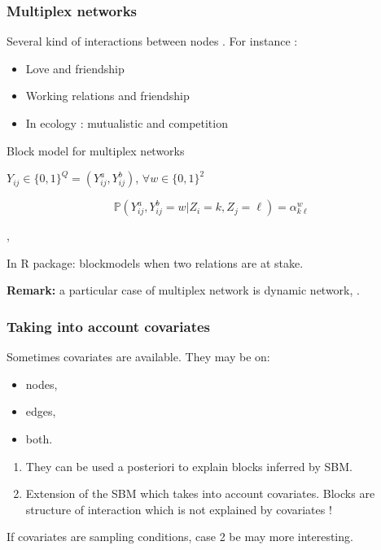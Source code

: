 \documentclass[compress,10pt]{beamer}
\begin{document}
\begin{frame} \frametitle{Multiplex networks}

Several kind of interactions between nodes . 
For instance : 


\begin{itemize}
\item Love and friendship
\item Working relations and friendship
\item  In ecology : mutualistic and competition
\end{itemize}


\begin{block}{Block model for multiplex networks}

$Y_{ij} \in \{0,1\} ^ Q = (Y_{ij}^a, Y_{ij}^b)$, $\forall w \in \{0,1\}^2$ 



$$\mathbb{P}(Y^a_{ij},Y^b_{ij} = w  | Z_i  = k, Z_j = \ell)  = \alpha^w _{k\ell}$$

\end{block}

\textcolor{mygreen}{
\cite{kefi}, \cite{barbillon2017stochastic}}

In \textcolor{mygreen}{R package: blockmodels} when two relations are at stake.
 

 \textbf{Remark:} a particular case of multiplex network is dynamic network, \textcolor{mygreen}{\cite{matias2017statistical}}.
 

 \end{frame}



 
\begin{frame}
 \frametitle{Taking into account covariates}
 
 Sometimes covariates are available. They may be on:
 \begin{itemize}
  \item nodes,
  \item edges,
  \item both.
 \end{itemize}

 
 
 \begin{enumerate}
  \item They can be used a posteriori to explain blocks inferred by SBM.
  \item Extension of the SBM which takes into account covariates. Blocks are structure of interaction which is not 
  explained by covariates !

 \end{enumerate}


 If covariates are sampling conditions, case 2  be  may more interesting.
 
\end{frame}
\end{document}
